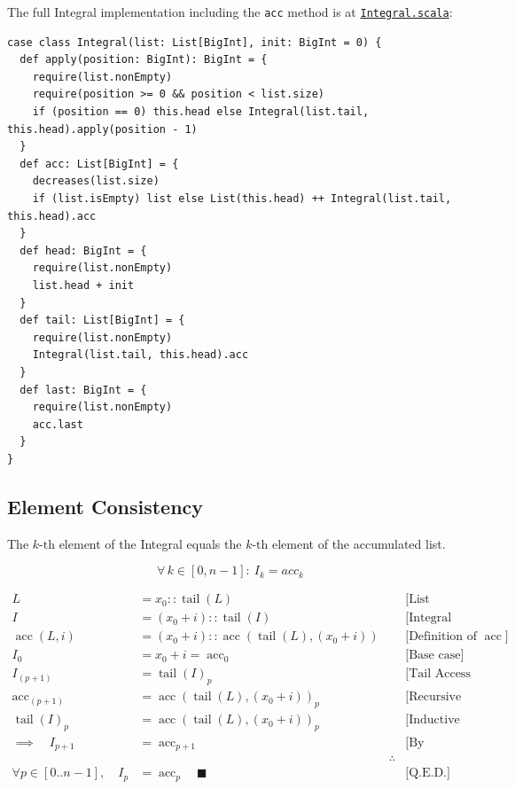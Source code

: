The full Integral implementation including the \texttt{acc} method is at
\href{https://github.com/thiagomata/prime-numbers/blob/master/src/main/scala/v1/chapter3/list/integral/Integral.scala}{\texttt{Integral.scala}}:

\begin{lstlisting}[style=scala]
case class Integral(list: List[BigInt], init: BigInt = 0) {
  def apply(position: BigInt): BigInt = {
    require(list.nonEmpty)
    require(position >= 0 && position < list.size)
    if (position == 0) this.head else Integral(list.tail, this.head).apply(position - 1)
  }
  def acc: List[BigInt] = {
    decreases(list.size)
    if (list.isEmpty) list else List(this.head) ++ Integral(list.tail, this.head).acc
  }
  def head: BigInt = {
    require(list.nonEmpty)
    list.head + init
  }
  def tail: List[BigInt] = {
    require(list.nonEmpty)
    Integral(list.tail, this.head).acc
  }
  def last: BigInt = {
    require(list.nonEmpty)
    acc.last
  }
}
\end{lstlisting}

\subsection{Element Consistency}
\label{sec:element-consistency}

The $k\text{-th}$ element of the Integral equals the $k\text{-th}$ element
of the accumulated list.

\begin{equation*}
\forall\, k \in [0, n-1]:\ I_k = acc_k
\end{equation*}

\begin{equation*}
\begin{aligned}
L &= x_0 :: \operatorname{tail}(L)
  && \text{[List decomposition]} \\
I &= (x_0 + i) :: \operatorname{tail}(I)
  && \text{[Integral decomposition]} \\
\operatorname{acc}(L, i) &= (x_0 + i) :: \operatorname{acc}(\operatorname{tail}(L),(x_0 + i))
  && \text{[Definition of } \operatorname{acc}] \\
I_0 &= x_0 + i = \operatorname{acc}_0
  && \text{[Base case]} \\
I_{(p+1)} &= \operatorname{tail}(I)_p
  && \text{[Tail Access Shift Left]} \\
\operatorname{acc}_{(p+1)} &= \operatorname{acc}(\operatorname{tail}(L),(x_0 + i))_p
  && \text{[Recursive accumulation]} \\
\operatorname{tail}(I)_p &= \operatorname{acc}(\operatorname{tail}(L), (x_0 + i))_p
  && \text{[Inductive hypothesis]} \\
\implies \quad I_{p+1} &= \operatorname{acc}_{p+1}
  && \text{[By substitution]} \\
&& \therefore \\
\forall p \in [0..n-1], \quad I_p &= \operatorname{acc}_p \quad \blacksquare
  && \text{[Q.E.D.]}
\end{aligned}
\end{equation*}

